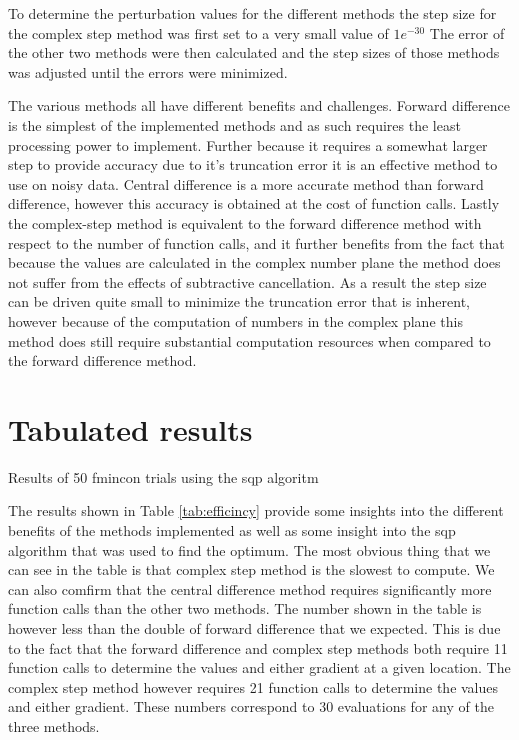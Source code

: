 \documentclass{article}
\begin{document}
To determine the perturbation values for the different methods the step size
for the complex step method was first set to a very small value of $1e^{-30}$
The error of the other two methods were then calculated and the step sizes of
those methods was adjusted until the errors were minimized.

The various methods all have different benefits and challenges.
Forward difference is the simplest of the implemented methods and as such requires the least processing power to implement.
Further because it requires a somewhat larger step to provide accuracy due to it's truncation error it is an effective method to use on noisy data.
Central difference is a more accurate method than forward difference, however this accuracy is obtained at the cost of function calls.
Lastly the complex-step method is equivalent to the forward difference method with respect to the number of function calls,
and it further benefits from the fact that because the values are calculated in the complex number plane the method does not suffer from the effects of subtractive cancellation.
As a result the step size can be driven quite small to minimize the truncation error that is inherent,
however because of the computation of numbers in the complex plane this method does still require substantial computation resources when compared to the forward difference method.

\section{Tabulated results}
\begin{table}[H]
	\caption{Results of 50 fmincon trials using the sqp algoritm}
	\label{tab:efficincy}
	\noindent{}
\end{table}

The results shown in Table \ref{tab:efficincy} provide some insights into the
different benefits of the methods implemented as well as some insight into the
sqp algorithm that was used to find the optimum.  The most obvious thing that we
can see in the table is that complex step method is the slowest to compute.  We
can also comfirm that the central difference method requires significantly more
function calls than the other two methods.  The number shown in the table is
however less than the double of forward difference that we expected.  This is
due to the fact that the forward difference and complex step methods both
require 11 function calls to determine the values and either gradient at a given location. The
complex step method however requires 21 function calls to determine the values and either
gradient.  These numbers correspond to 30 evaluations for any of the three
methods.
\end{document}
